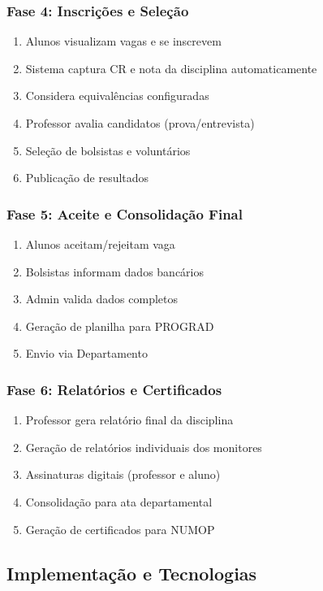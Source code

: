 \documentclass[portuguese]{sbc2025}%
\begin{document}
\subsubsection{Fase 4: Inscrições e Seleção}

\begin{enumerate}
  \item Alunos visualizam vagas e se inscrevem
  \item Sistema captura CR e nota da disciplina automaticamente
  \item Considera equivalências configuradas
  \item Professor avalia candidatos (prova/entrevista)
  \item Seleção de bolsistas e voluntários
  \item Publicação de resultados
\end{enumerate}

\subsubsection{Fase 5: Aceite e Consolidação Final}

\begin{enumerate}
  \item Alunos aceitam/rejeitam vaga
  \item Bolsistas informam dados bancários
  \item Admin valida dados completos
  \item Geração de planilha para PROGRAD
  \item Envio via Departamento
\end{enumerate}

\subsubsection{Fase 6: Relatórios e Certificados}

\begin{enumerate}
  \item Professor gera relatório final da disciplina
  \item Geração de relatórios individuais dos monitores
  \item Assinaturas digitais (professor e aluno)
  \item Consolidação para ata departamental
  \item Geração de certificados para NUMOP
\end{enumerate}

\subsection{Implementação e Tecnologias}
\end{document}
